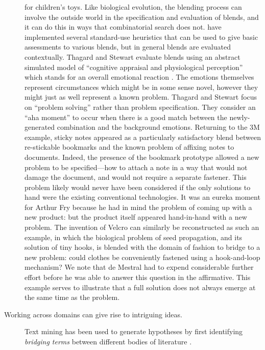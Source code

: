 \begin{description}
  for children's toys.  Like biological evolution, the blending
  process can involve the outside world in the specification and
  evaluation of blends, and it can do this in ways that combinatorial
  search does not.  \citet{EPPE2018105} have implemented several
  standard-use heuristics that can be used to give basic assessments
  to various blends, but in general blends are evaluated contextually.
  Thagard and Stewart evaluate blends using an abstract simulated
  model of ``cognitive appraisal and physiological perception'' which
  stands for an overall emotional reaction
  \cite[p.~11]{thagard2011aha}. The emotions themselves represent
  circumstances which might be in some sense novel, however they might just as
  well represent a known problem.  Thagard and Stewart
  focus on ``problem solving'' rather than
  problem specification.  They consider an ``aha moment'' to occur when there is a
  good match between the newly-generated combination and the
  background emotions.
  Returning to the 3M
  example, sticky notes appeared as a particularly satisfactory blend
  between re-stickable bookmarks and the known problem
  of affixing notes to documents.  Indeed, the presence
  of the bookmark prototype allowed a new problem to be
  specified---how to attach a note in a way that would not damage the
  document, and would not require a separate fastener.
  This problem likely would never have been considered if
  the only solutions to hand were the existing conventional
  technologies.  It was an eureka moment for Arthur Fry because he
  had in mind the problem of coming up with a new product: but the
  product itself appeared hand-in-hand with a new problem.  The
  invention of Velcro\textsuperscript{\texttrademark} can similarly be
  reconstructed as such an example, in which the biological problem of
  seed propagation, and its solution of tiny hooks, is blended with
  the domain of fashion to bridge to a new problem: could clothes be
  conveniently fastened using a hook-and-loop mechanism?  We note
  that de Mestral had to expend considerable further effort before he
  was able to answer this question in the affirmative.  This example
  serves to illustrate that a full solution does not always emerge at the same time
  as the problem.
\item[Working across domains can give rise to intriguing ideas.] Text mining has
  been used to generate hypotheses by first identifying \emph{bridging
    terms} between different bodies of literature \cite{swanson1997interactive,weeber2001using,jursic2012,jurvsivc2012cross}.

\end{description}
